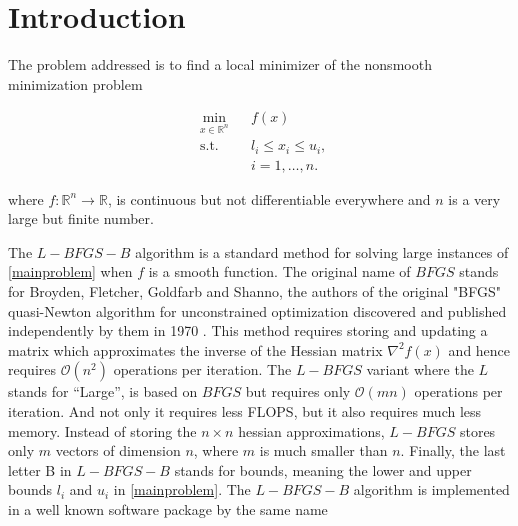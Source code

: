 
\chapter{Introduction} %

\label{Chapter1} %


The problem addressed is to find a local minimizer of the nonsmooth minimization problem

\begin{equation} \label{mainproblem}
  \begin{aligned}
    & \underset{x \in \mathbb{R}^n}{\text{min}}
    & & f(x) \\
    & \text{s.t.}
    & & l_i \leq x_i \leq u_i , \; \\
    & & & i = 1, \ldots, n.
  \end{aligned}
\end{equation}

where $f \colon \mathbb{R}^n \to \mathbb{R}$, is continuous but not differentiable everywhere and $n$ is a very large but finite number.

The $L-BFGS-B$ algorithm \citep{lbfgsboriginal} is a standard method for solving large instances of \ref{mainproblem} when $f$ is a smooth function. The original name of $BFGS$ stands for Broyden, Fletcher, Goldfarb and Shanno, the authors
of the original "BFGS" quasi-Newton algorithm for unconstrained
optimization discovered and published
independently by them in 1970 \citep{Broyden} \citep{Fletcher} \citep{Goldfarb} \citep{Shanno}.
This method requires storing and updating a matrix which 
approximates the inverse of the Hessian matrix $\nabla^2 f(x)$ and
hence requires $\mathcal{O}(n^2)$ operations per iteration.  
The $L-BFGS$ variant \citep{MR572855} where the $L$ stands for ``Large'', is based on $BFGS$ but requires only $\mathcal{O}(mn)$ operations per iteration. And not only it requires less FLOPS, but it also requires much less memory. Instead of storing the $n \times n$ hessian approximations, $L-BFGS$ stores only $m$ vectors of dimension $n$, where $m$ is much smaller than $n$. Finally, the last letter B in 
$L-BFGS-B$ stands for bounds, meaning the lower and upper
bounds $l_i$ and $u_i$ in \ref{mainproblem}.  The $L-BFGS-B$ algorithm
is implemented in a well known \fortran software package
by the same name \citep{lbfgsbsoftware}

